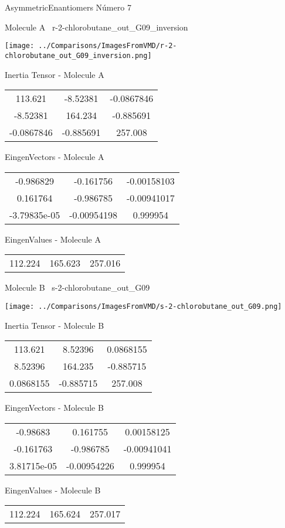 \vtab[-3cm]
\begin{center}
{\large AsymmetricEnantiomers \tab Número 7}
\end{center}
\begin{multicols}{2}
\begin{center}

Molecule A \
r-2-chlorobutane\_out\_G09\_inversion

\texttt{[image: ../Comparisons/ImagesFromVMD/r-2-chlorobutane\_out\_G09\_inversion.png]}

Inertia Tensor - Molecule A \\
\begin{tabular}{|c c c|}
113.621	 & 	-8.52381	 & 	-0.0867846	 \\
-8.52381	 & 	164.234	 & 	-0.885691	 \\
-0.0867846	 & 	-0.885691	 & 	257.008
\end{tabular}

\vtab
 EingenVectors - Molecule A     \\
\begin{tabular}{|c c c|}
-0.986829	 & 	-0.161756	 & 	-0.00158103	 \\
0.161764	 & 	-0.986785	 & 	-0.00941017	 \\
-3.79835e-05	 & 	-0.00954198	 & 	0.999954
\end{tabular}

\vtab
 EingenValues - Molecule A     \\
\begin{tabular}{|c c c|}
112.224	 & 	165.623	 & 	257.016	 \\
\end{tabular}
\columnbreak

Molecule B \
s-2-chlorobutane\_out\_G09

\texttt{[image: ../Comparisons/ImagesFromVMD/s-2-chlorobutane\_out\_G09.png]}

Inertia Tensor - Molecule B \\
\begin{tabular}{|c c c|}
113.621	 & 	8.52396	 & 	0.0868155	 \\
8.52396	 & 	164.235	 & 	-0.885715	 \\
0.0868155	 & 	-0.885715	 & 	257.008
\end{tabular}

\vtab
 EingenVectors - Molecule B     \\
\begin{tabular}{|c c c|}
-0.98683	 & 	0.161755	 & 	0.00158125	 \\
-0.161763	 & 	-0.986785	 & 	-0.00941041	 \\
3.81715e-05	 & 	-0.00954226	 & 	0.999954
\end{tabular}

\vtab
 EingenValues - Molecule B     \\
\begin{tabular}{|c c c|}
112.224	 & 	165.624	 & 	257.017	 \\
\end{tabular}

\end{center}
\end{multicols}

